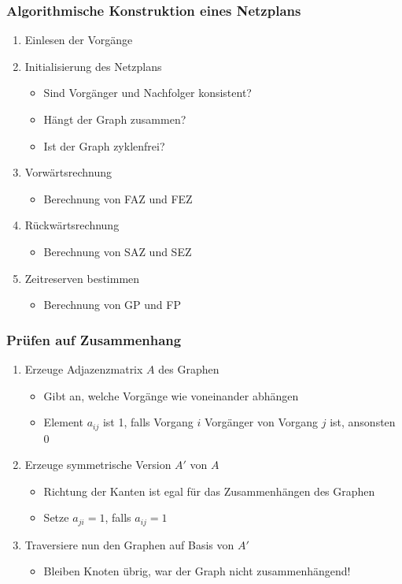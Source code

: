 \documentclass[ngerman, t]{beamer}
\begin{document}
\begin{frame}
  \frametitle{Algorithmische Konstruktion eines Netzplans}
  \begin{enumerate}
    \item Einlesen der Vorg\"ange
    \item Initialisierung des Netzplans
      \begin{itemize}
        \item Sind Vorg\"anger und Nachfolger konsistent?
        \item H\"angt der Graph zusammen?
        \item Ist der Graph zyklenfrei?
      \end{itemize}
    \item Vorw\"artsrechnung
      \begin{itemize}
        \item Berechnung von FAZ und FEZ
      \end{itemize}
    \item R\"uckw\"artsrechnung
      \begin{itemize}
        \item Berechnung von SAZ und SEZ
      \end{itemize}
    \item Zeitreserven bestimmen
      \begin{itemize}
        \item Berechnung von GP und FP
      \end{itemize}
  \end{enumerate}
\end{frame}

\begin{frame}
  \frametitle{Pr\"ufen auf Zusammenhang}
  \begin{enumerate}
    \item Erzeuge Adjazenzmatrix $A$ des Graphen
      \begin{itemize}
        \item Gibt an, welche Vorg\"ange wie voneinander abh\"angen
        \item Element $a_{ij}$ ist 1, falls Vorgang $i$ Vorg\"anger
          von Vorgang $j$ ist, ansonsten 0
      \end{itemize}
    \item Erzeuge symmetrische Version $A'$ von $A$
      \begin{itemize}
        \item Richtung der Kanten ist egal f\"ur das Zusammenh\"angen
          des Graphen
        \item Setze $a_{ji}=1$, falls $a_{ij}=1$
      \end{itemize}
    \item Traversiere nun den Graphen auf Basis von $A'$
      \begin{itemize}
        \item Bleiben Knoten \"ubrig, war der Graph nicht zusammenh\"angend!
      \end{itemize}
  \end{enumerate}
\end{frame}
\end{document}
